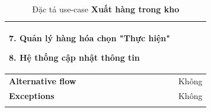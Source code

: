 \begin{longtable}{| p{} | p{} |}
                    7. Quản lý hàng hóa chọn "Thực hiện"
                    
                    8. Hệ thống cập nhật thông tin
                \\
                \hline
                    \textbf{Alternative flow}
                &
                    Không
                \\
                \hline
                    \textbf{Exceptions} 
                &
                    Không
                \\
                \hline
                \caption{Đặc tả use-case \textbf{Xuất hàng trong kho}}
            \end{longtable}


